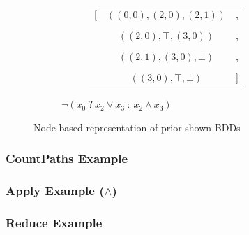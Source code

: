\documentclass[english, aspectratio=169]{beamer}
\begin{document}
\begin{frame}
\begin{figure}
\begin{subfigure}{0.49\linewidth}
      \begin{subfigure}[b]{0.33\linewidth}
        \centering
        \begin{tikzpicture}[scale=0.6, every node/.style={transform shape}]
          
        \end{tikzpicture}
      \end{subfigure}
      \begin{subfigure}[b]{0.55\linewidth}
        \centering
        { \tiny
          \begin{tabular}{r c l}
            [ & $((0,0), (2,0), (2,1))$ & ,
            \\ \\
              & $((2,0), \top, (3,0))$ & ,
            \\ \\
              & $((2,1), (3,0), \bot)$   & ,
            \\ \\
              & $((3,0), \top, \bot)$   & ]
          \end{tabular}
          \vspace{10pt}
        }
      \end{subfigure}

      \caption{$\neg (x_0 \ ?\ x_2 \vee x_3 \ :\ x_2 \wedge x_3)$}
    \end{subfigure}

    \caption{Node-based representation of prior shown BDDs}
  \end{figure}

\end{frame}

\begin{frame}
  \frametitle{CountPaths Example}

  
\end{frame}

\begin{frame}
  
\end{frame}

\begin{frame}
  \frametitle{Apply Example ($\wedge$)}

  
\end{frame}

\begin{frame}
  \frametitle{Reduce Example}

    
\end{frame}
\end{document}

